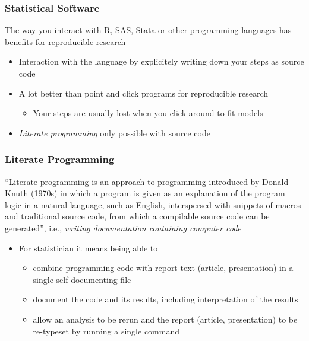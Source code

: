 \documentclass[paper=screen,mathserif]{beamer}\usepackage[]{graphicx}\usepackage[]{color}
\begin{document}
\begin{frame}
  \frametitle{Statistical Software}
  The way you interact with R, SAS, Stata or other programming
  languages has benefits for reproducible research
  \begin{itemize}
  \item Interaction with the language by explicitely writing down your
    steps as source code
  \item A lot better than point and click programs for reproducible
    research
    \begin{itemize}
    \item Your steps are usually lost when you click around to fit
      models 
    \end{itemize}
  \item {\em Literate programming} only possible with source code
  \end{itemize}
\end{frame}

\begin{frame}
  \frametitle{Literate Programming} ``Literate programming is an
  approach to programming introduced by Donald Knuth (1970s) in which
  a program is given as an explanation of the program logic in a
  natural language, such as English, interspersed with snippets of
  macros and traditional source code, from which a compilable source
  code can be generated'', i.e., {\em writing documentation containing
    computer code}
  \vspace{0.3cm}\pause
  \begin{itemize}
  \item For statistician it means being able to
    \begin{itemize}
    \item combine programming code with report text (article,
      presentation) in a single self-documenting file
    \item document the code and its results, including interpretation
      of the results
    \item allow an analysis to be rerun and the report (article,
      presentation) to be re-typeset by running a single command
    \end{itemize}
   \end{itemize}
\end{frame}
\end{document}
